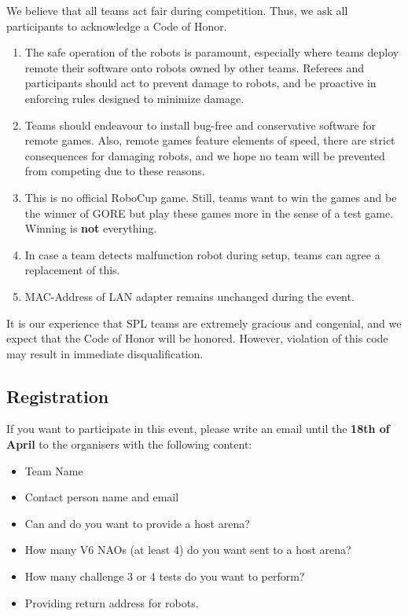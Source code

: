 We believe that all teams act fair during competition. Thus, we ask all participants to acknowledge a Code of Honor.
\begin{enumerate}
    \item The safe operation of the robots is paramount, especially where teams deploy remote their software onto robots owned by other teams. Referees and participants should act to prevent damage to robots, and be proactive in enforcing rules  designed to minimize damage.
    \item Teams should endeavour to install bug-free and conservative software for remote games. Also, remote games feature elements of speed, there are strict consequences for damaging robots, and we hope no team will be prevented from competing due to these reasons.
    \item This is no official RoboCup game. Still, teams want to win the games and be the winner of GORE but play these games more in the sense of a test game. Winning is \textbf{not} everything.
    \item In case a team detects malfunction robot during setup, teams can agree a replacement of this.
    \item MAC-Address of LAN adapter remains unchanged during the event.
\end{enumerate} 

It is our experience that SPL teams are extremely gracious and congenial, and we expect that the Code of Honor will be honored. However, violation of this code may result in immediate disqualification.

\subsection{Registration}

If you want to participate in this event, please write an email until the \textbf{18th of April} to the organisers with the following content:
\begin{itemize}
    \item Team Name
    \item Contact person name and email
    \item Can and do you want to provide a host arena?
    \item How many V6 NAOs (at least 4) do you want sent to a host arena?
    \item How many challenge 3 or 4 tests do you want to perform?
    \item Providing return address for robots.
\end{itemize}

